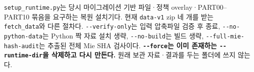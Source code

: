 \texttt{setup\_\allowbreak{}runtime.\allowbreak{}py}는 당시 마이그레이션 기반 파일·정책 overlay·PART00--PART10 묶음을 요구하는 복원 설치기다. 현재 \texttt{data-\allowbreak{}v1} zip 네 개를 받는 \texttt{fetch\_\allowbreak{}data}와 다른 절차다. \texttt{-\allowbreak{}-\allowbreak{}verify-\allowbreak{}only}는 입력 압축파일 검증 후 종료, \texttt{-\allowbreak{}-\allowbreak{}no-\allowbreak{}python-\allowbreak{}data}는 Python 짝 자료 설치 생략, \texttt{-\allowbreak{}-\allowbreak{}no-\allowbreak{}build}는 빌드 생략, \texttt{-\allowbreak{}-\allowbreak{}full-\allowbreak{}mie-\allowbreak{}hash-\allowbreak{}audit}는 추출된 전체 Mie SHA 검사이다. \textbf{\texttt{-\allowbreak{}-\allowbreak{}force}는 이미 존재하는 \texttt{-\allowbreak{}-\allowbreak{}runtime-\allowbreak{}dir}을 삭제하고 다시 만든다.} 원래 보관 자료·결과를 두는 폴더에 쓰지 않는다.

